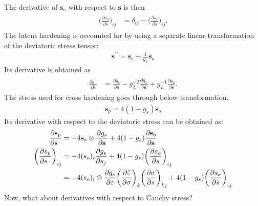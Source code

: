 \documentclass[12pt]{amsart}
\begin{document}
The derivative of $\mathbf{s}_o$ with respect to $\mathbf{s}$ is then
\begin{eqnarray}
  \label{eq:decomp4}
  \begin{split}
    \bigg(\frac{\partial s_o}{\partial s}\bigg)_{ij} &= \delta_{ij}- \bigg(\frac{\partial s_c}{\partial s}\bigg)_{ij}.
  \end{split}
\end{eqnarray}
The latent hardening is accounted for by using a separate linear-transformation of the deviatoric stress tensor:
\begin{eqnarray}
  \label{eq:latent_decompose1}
  \mathbf{s}^{\prime\prime}=\mathbf{s}_c+\frac{1}{g_L}\mathbf{s}_o
\end{eqnarray}
Its derivative is obtained as
\begin{eqnarray}
  \begin{split}
    \label{eq:latent_decompose2}
    \frac{\partial\mathbf{s}^{\prime\prime}}{\partial\mathbf{s}} &=\frac{\partial\mathbf{s}_c}{\partial\mathbf{s}}-g_L^{-2}\frac{\partial g_L}{\partial \mathbf{s}} +g_L^{-1} \frac{\partial\mathbf{s}_o}{\partial\mathbf{s}}.
  \end{split}
\end{eqnarray}
The stress used for cross hardening goes through below transformation.
\begin{eqnarray}
  \label{eq:cross_linear1}
  \mathbf{s}_p = 4(1-g_s)\mathbf{s}_o
\end{eqnarray}
Its derivative with respect to the deviatoric stress can be obtained as:
\begin{eqnarray}
  \begin{split}
    \label{eq:cross_linear2}
    \frac{\partial\mathbf{s}_p}{\partial\mathbf{s}\hfill}  &= -4\mathbf{s}_o\otimes\frac{\partial g_s}{\partial \mathbf{s}}+4(1-g_s) \frac{\partial\mathbf{s}_o}{\partial\mathbf{s}} \\
    \bigg(\frac{\partial s_p}{\partial s\hfill} \bigg)_{ij} &= -4(s_o)_i\frac{\partial g_s}{\partial s_j} + 4(1-g_s) \bigg(\frac{\partial s_o}{\partial s}\bigg)_{ij}\\
    &= -4(s_o)_i\otimes\frac{\partial g_s}{\partial \bar{\varepsilon}}\bigg(\frac{\partial\bar{\varepsilon}}{\partial\sigma}\bigg)_k\bigg(\frac{\partial\sigma}{\partial s}\bigg)_{kj} + 4(1-g_s) \bigg(\frac{\partial s_o}{\partial s}\bigg)_{ij}
  \end{split}
\end{eqnarray}
Now, what about derivatives with respect to Cauchy stress?
\end{document}

